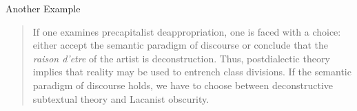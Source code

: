 \documentclass[xcolor={usenames,svgnames,x11names,dvipsnames,table}]{beamer}
\begin{document}
\begin{frame}{Another Example}
    \small

    \begin{quotation}
        If one examines precapitalist deappropriation, one is faced with a choice:
        either accept the semantic paradigm of discourse or conclude that the \emph{raison
        d’etre} of the artist is deconstruction. Thus, postdialectic theory implies that
        reality may be used to entrench class divisions. If the semantic paradigm of
        discourse holds, we have to choose between deconstructive subtextual theory and
        Lacanist obscurity.
    \end{quotation}

    
\end{frame}
\end{document}
